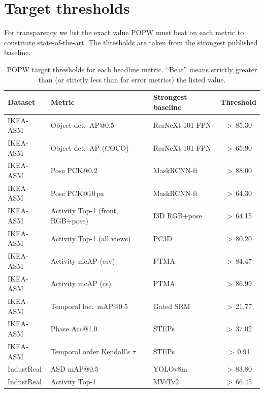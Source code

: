 \documentclass[11pt,a4paper]{article}
\newcommand{\popw}{POPW}
\newcommand{\ikea}{IKEA-ASM}
\newcommand{\industreal}{IndustReal}
\newcommand{\map}{mAP}
\begin{document}
\FloatBarrier
\section{Target thresholds}
\label{sec:targets}

For transparency we list the exact value \popw{} must beat on each metric to constitute
state-of-the-art. The thresholds are taken from the strongest published baseline.

\begin{table}[!htbp]
\centering
\small
\caption{\popw{} target thresholds for each headline metric. ``Beat'' means strictly greater
than (or strictly less than for error metrics) the listed value.}
\label{tab:targets}
\renewcommand{\arraystretch}{1.15}
\begin{tabular}{l l l c}
\toprule
\textbf{Dataset} & \textbf{Metric} & \textbf{Strongest baseline} & \textbf{Threshold} \\
\midrule
\ikea{}         & Object det.\ AP@0.5             & ResNeXt-101-FPN  & $>$\,85.30 \\
\ikea{}         & Object det.\ AP (COCO)          & ResNeXt-101-FPN  & $>$\,65.90 \\
\ikea{}         & Pose PCK@0.2                    & MaskRCNN-ft      & $>$\,88.00 \\
\ikea{}         & Pose PCK@10\,px                 & MaskRCNN-ft      & $>$\,64.30 \\
\ikea{}         & Activity Top-1 (front, RGB+pose) & I3D RGB+pose     & $>$\,64.15 \\
\ikea{}         & Activity Top-1 (all views)      & PC3D             & $>$\,80.20 \\
\ikea{}         & Activity mcAP (csv)             & PTMA             & $>$\,84.47 \\
\ikea{}         & Activity mcAP (cs)              & PTMA             & $>$\,86.99 \\
\ikea{}         & Temporal loc.\ \map{}@0.5       & Gated SRM        & $>$\,21.77 \\
\ikea{}         & Phase Acc@1.0                   & STEPs            & $>$\,37.02 \\
\ikea{}         & Temporal order Kendall's $\tau$ & STEPs            & $>$\,0.91 \\
\midrule
\industreal{}   & ASD \map{}@0.5                  & YOLOv8m          & $>$\,83.80 \\
\industreal{}   & Activity Top-1                  & MViTv2           & $>$\,66.45 \\

\end{tabular}
\end{table}
\end{document}
